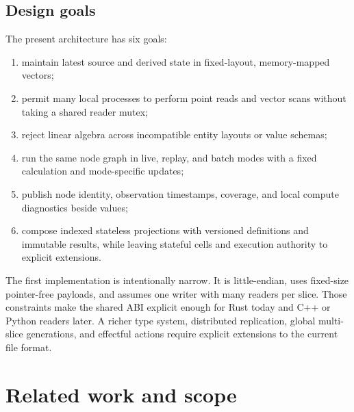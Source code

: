 \documentclass{strategynet-journal}
\begin{document}
\begin{SNcolumns}
\section{Design goals}

The present architecture has six goals:
\begin{enumerate}
  \item maintain latest source and derived state in fixed-layout,
        memory-mapped vectors;
  \item permit many local processes to perform point reads and vector scans
        without taking a shared reader mutex;
  \item reject linear algebra across incompatible entity layouts or value
        schemas;
  \item run the same node graph in live, replay, and batch modes with a fixed
        calculation and mode-specific updates;
  \item publish node identity, observation timestamps, coverage, and local
        compute diagnostics beside values;
  \item compose indexed stateless projections with versioned definitions and
        immutable results, while leaving stateful cells and execution authority
        to explicit extensions.
\end{enumerate}

The first implementation is intentionally narrow.  It is
little-endian, uses fixed-size pointer-free payloads, and assumes one writer
with many readers per slice.  Those constraints make the shared ABI explicit
enough for Rust today and C++ or Python readers later.  A richer type system,
distributed replication, global multi-slice generations, and effectful
actions require explicit extensions to the current file format.

\end{SNcolumns}

\clearpage
\section{Related work and scope}
\end{document}
